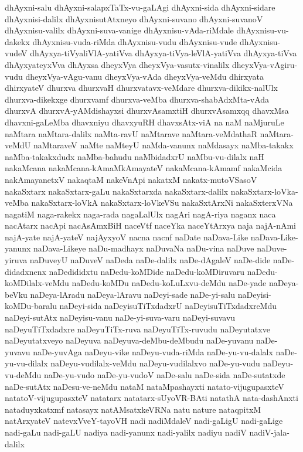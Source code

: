 {dhAyxni-salu
dhAyxni-salapxTaTx-vu-gaLAgi
dhAyxni-sida
dhAyxni-sidare
dhAyxnisi-dalilx
dhAyxnisutAtxneyo
dhAyxni-suvano
dhAyxni-suvanoV
dhAyxnisu-valilx
dhAyxni-suva-vanige
dhAyxnisu-vAda-riMdale
dhAyxnisu-vu-dakekx
dhAyxnisu-vuda-riMda
dhAyxnisu-vudu
dhAyxnisu-vude
dhAyxnisu-vudeV
dhAyxya-tiVyaliVlA-yatiVva
dhAyxya-tiVya-leVlA-yatiVva
dhAyxya-tiVva
dhAyxyateyxVva
dhAyxsa
dheyxVya
dheyxVya-vasutx-vinalilx
dheyxVya-vAgiru-vudu
dheyxVya-vAgu-vanu
dheyxVya-vAda
dheyxVya-veMdu
dhirxyata
dhirxyateV
dhurxva
dhurxvaH
dhurxvatavx-veMdare
dhurxva-dikikx-nalUlx
dhurxva-dikekxge
dhurxvamf
dhurxva-veMba
dhurxva-shabAdxMta-vAda
dhurxvA
dhurxvA-yAMdishayxsi
dhurxvAsamxtiH
dhurxvAsamxqq
dhavxMsa
dhavxni-gaLeMba
dhavxniyu
dhavxyuRH
dhavxsAtx-viA
na
naM
naMjuruLe
naMtara
naMtara-dalilx
naMta-ravU
naMtarave
naMtara-veMdathaR
naMtara-veMdU
naMtaraveV
naMte
naMteyU
naMda-vanunx
naMdasayx
naMba-takakx
naMba-takakxdudx
naMba-bahudu
naMbidadxrU
naMbu-vu-dilalx
naH
nakaMcana
nakaMcana-kAmaMkAmayateV
nakaMcana-kAmamf
nakaMcida
nakAmayanetxV
nakaqtaM
nakeVnApi
nakatxM
nakatx-mutoVSasoV
nakaSxtarx
nakaSxtarx-gaLu
nakaSxtarxda
nakaSxtarx-dalilx
nakaSxtarx-loVka-veMba
nakaSxtarx-loVkA
nakaSxtarx-loVkeVSu
nakaSxtArxNi
nakaSxterxVNa
nagatiM
naga-rakekx
naga-rada
nagaLalUlx
nagAri
nagA-riya
naganx
naca
nacAtarx
nacApi
nacAsAmxBiH
naceVtf
naceYka
naceYtArxya
naja
najA-nAmi
najA-yate
najA-yateV
najAyxyoV
nacna
nacnf
naDate
naDava-Like
naDava-Like-yanunx
naDava-Likeye
naDu-madhayx
naDuvaNa
naDu-vina
naDuve
naDuve-yiruva
naDuveyU
naDuveV
naDeda
naDe-dalilx
naDe-dAgaleV
naDe-dide
naDe-didadxnenx
naDedididxtu
naDedu-koMDide
naDedu-koMDiruvaru
naDedu-koMDilalx-veMdu
naDedu-koMDu
naDedu-koLuLxvu-deMdu
naDe-yade
naDeya-beVku
naDeya-lAradu
naDeya-lAravu
naDeyi-sade
naDe-yi-salu
naDeyisi-koMDu-baralu
naDeyi-sida
naDeyisuTiTxdadxrU
naDeyisuTiTxdadxreMdu
naDeyi-sutAtx
naDeyisu-vanu
naDe-yi-suva-varu
naDeyi-suvavu
naDeyuTiTxdadxre
naDeyuTiTx-ruva
naDeyuTiTx-ruvudu
naDeyutatxve
naDeyutatxveyo
naDeyuva
naDeyuva-deMbu-deMbudu
naDe-yuvanu
naDe-yuvavu
naDe-yuvAga
naDeyu-vike
naDeyu-vuda-riMda
naDe-yu-vu-dalalx
naDe-yu-vu-dilalx
naDeyu-vudilalx-veMdu
naDeyu-vudilalxvo
naDe-yu-vudu
naDeyu-vu-deMdu
naDe-yu-vudo
naDe-yu-vudoV
naDe-salu
naDe-sida
naDe-sutatxde
naDe-sutAtx
naDesu-ve-neMdu
nataM
nataMpashayxti
natato-vijugupasxteV
natatoV-vijugupasxteV
natatarx
natatarx-sUyoVR-BAti
natathA
nata-dashAnxti
nataduyxkatxmf
natasayx
natAMsatxkeVRNa
natu
nature
nataqpitxM
natArxyateV
natevxVveY-tayoVH
nadi
nadiMdaleV
nadi-gaLigU
nadi-gaLige
nadi-gaLu
nadi-gaLU
nadiya
nadi-yanunx
nadi-yalilx
nadiyu
nadiV
nadiV-jala-dalilx
}
